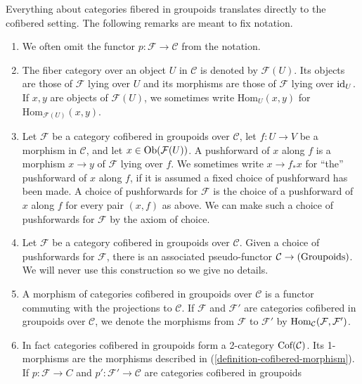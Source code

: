 \begin{remarks}
\label{remarks-cofibered-groupoids}
Everything about categories fibered in groupoids translates directly to the 
cofibered setting.  The following remarks are meant to fix notation.
\begin{enumerate}
\item We often omit the functor $p: \mathcal F \rightarrow \mathcal C$ from the 
notation.
\item The fiber category over an object $U$ in $\mathcal C$ is denoted by 
$\mathcal F(U)$. Its objects are those of $\mathcal F$ lying over $U$ and its 
morphisms are those of $\mathcal F$ lying over $\textnormal{id}_{U}$.  If $x,y$ 
are objects of $\mathcal F(U)$, we sometimes write $\text{Hom}_{U}(x,y)$ for 
$\text{Hom}_{\mathcal F(U)}(x,y)$.
\item Let $\mathcal F$ be a category cofibered in groupoids over $\mathcal C$, 
let $f: U \rightarrow V$ be a morphism in $\mathcal C$, and let $x \in 
\textnormal{Ob}(\mathcal F(U))$.  A pushforward of $x$ along $f$ is a morphism 
$x \rightarrow y$ of $\mathcal F$ lying over $f$.  We sometimes write $x 
\rightarrow f_*x$ for ``the'' pushforward of $x$ along $f$, if it is assumed a 
fixed choice of pushforward has been made.  A choice of pushforwards for 
$\mathcal F$ is the choice of a pushforward of $x$ along $f$ for every pair 
$(x,f)$ as above.  We can make such a choice of pushforwards for $\mathcal F$ 
by the axiom of choice.
\item Let $\mathcal F$ be a category cofibered in groupoids over $\mathcal C$. 
Given a choice of pushforwards for $\mathcal F$, there is an associated 
pseudo-functor $\mathcal C \rightarrow \textnormal{(Groupoids)}$.  We will 
never use this construction so we give no details.
\item
\label{definition-cofibered-morphism}
A morphism of categories cofibered in groupoids over $\mathcal C$ is a functor 
commuting with the projections to $\mathcal C$.  If $\mathcal F$ and $\mathcal 
F'$ are categories cofibered in groupoids over $\mathcal C$, we denote the 
morphisms from $\mathcal F$ to $\mathcal F'$ by $\textnormal{Hom}_{\mathcal 
C}(\mathcal F, \mathcal F')$.
\item 
\label{definition-cofibered-groupoids-2-category}
In fact categories cofibered in groupoids form a 2-category 
$\textnormal{Cof}(\mathcal C)$. Its 1-morphisms are the morphisms described in 
(\ref{definition-cofibered-morphism}).  If $p: \mathcal F \rightarrow C$ and 
$p': \mathcal F' \rightarrow \mathcal C$ are categories cofibered in groupoids 

\end{enumerate}
\end{remarks}
